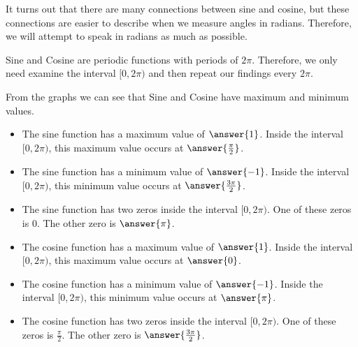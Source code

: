 \documentclass{ximera}
\begin{document}
\begin{onlineOnly}

\begin{center}
\end{center}


\begin{center}
\end{center}

\end{onlineOnly}





It turns out that there are many connections between sine and cosine, but these connections are easier to describe when we measure angles in radians.  Therefore, we will attempt to speak in radians as much as possible.


Sine and Cosine are periodic functions with periods of $2\pi$. Therefore, we only need examine the interval $[0, 2\pi)$ and then repeat our findings every $2\pi$.

From the graphs we can see that Sine and Cosine have maximum and minimum values.


\begin{itemize}

  \item The sine function has a maximum value of $\answer{1}$.  Inside the interval $[0, 2\pi)$, this maximum value occurs at $\answer{\frac{\pi}{2}}$.

  \item The sine function has a minimum value of $\answer{-1}$.  Inside the interval $[0, 2\pi)$, this minimum value occurs at $\answer{\frac{3\pi}{2}}$.

  \item The sine function has two zeros inside the interval $[0, 2\pi)$. One of these zeros is $0$.  The other zero is $\answer{\pi}$.


\end{itemize}





\begin{itemize}
  
  \item The cosine function has a maximum value of $\answer{1}$.  Inside the interval $[0, 2\pi)$, this maximum value occurs at $\answer{0}$.

  \item The cosine function has a minimum value of $\answer{-1}$.  Inside the interval $[0, 2\pi)$, this minimum value occurs at $\answer{\pi}$.

  \item The cosine function has two zeros inside the interval $[0, 2\pi)$. One of these zeros is $\frac{\pi}{2}$.  The other zero is $\answer{\frac{3\pi}{2}}$.


\end{itemize}
\end{document}
